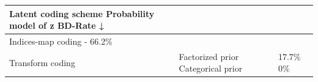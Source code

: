 \begin{tabular}{lll}
\toprule
Latent coding scheme Probability model of z BD-Rate ↓ &  &  \\
\midrule
Indices-map coding - 66.2\% &  &  \\
Transform coding & Factorized prior Categorical prior & 17.7\% 0\% \\
\bottomrule
\end{tabular}
